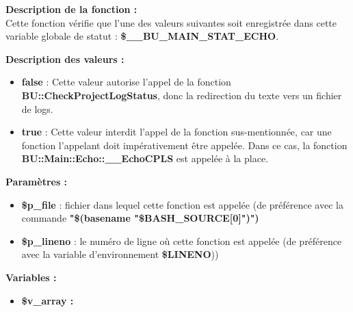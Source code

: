 \documentclass[a4paper,10pt]{article}
\begin{document}
\begin{justify}
    \textbf{Description de la fonction :}\\
    Cette fonction vérifie que l'une des valeurs suivantes soit enregistrée dans cette variable globale de statut : \textbf{\color{orange}\$\_\_BU\_MAIN\_STAT\_ECHO}.
\end{justify}

\begin{justify}
    \textbf{Description des valeurs :}

    \begin{itemize}
        \item \textbf{false} : Cette valeur autorise l'appel de la fonction \textbf{\color{mauve}BU::CheckProjectLogStatus}, donc la redirection du texte vers un fichier de logs.\\

        \item \textbf{true} : Cette valeur interdit l'appel de la fonction sus-mentionnée, car une fonction l'appelant doit impérativement être appelée. Dans ce cas, la fonction \textbf{\color{mauve}BU::Main::Echo::\_\_EchoCPLS} est appelée à la place.
    \end{itemize}

\end{justify}

\begin{justify}
    \textbf{Paramètres :}

    \begin{itemize}
        \item \color{orange}\textbf{\$p\_file}\color{white} : fichier dans lequel cette fonction est appelée (de préférence avec la commande \textbf{"\$(\color{gray}basename \color{white}"\color{orange}\$BASH\_SOURCE[0]\color{white}")")}\\

        \item \color{orange}\textbf{\$p\_lineno}\color{white} : le numéro de ligne où cette fonction est appelée (de préférence avec la variable d'environnement \textbf{\color{orange}\$LINENO}))
    \end{itemize}
\end{justify}

\begin{justify}
    \textbf{Variables :}

    \begin{itemize}
        \item \textbf{\color{orange}\$v\_array\color{white} :}
    \end{itemize}
\end{justify}
\end{document}
